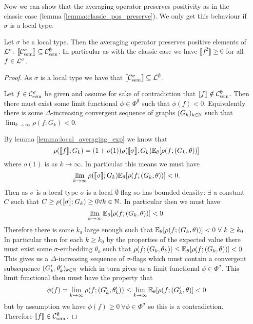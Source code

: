 Now we can show that the averaging operator preserves positivity as in the
classic case (lemma \ref{lemma:classic_pos_preserve}). We only get this
behaviour if $\sigma$ is a local type.

\begin{lemma}
    \label{lemma:local_pos_preserve}
    Let $\sigma$ be a local type. Then the averaging operator preserves positive
    elements of $\mathcal{L}^\sigma$:
    $\llbracket \mathcal{C}_\mathrm{sem}^\sigma \rrbracket \subseteq  \mathcal{C}_\mathrm{sem}^\emptyset$.
    In particular as with the classic case we have $\llbracket f^2 \rrbracket \geq 0$
    for all $f\in\mathcal{L}^\sigma$.
\end{lemma}

\begin{proof}
    As $\sigma$ is a local type we have that
    $\llbracket \mathcal{C}_\mathrm{sem}^\sigma \rrbracket \subseteq \mathcal{L}^\emptyset$.

    Let $f\in\mathcal{C}_\mathrm{sem}^\sigma$ be given and assume for sake of contradiction that
    $\llbracket f \rrbracket \notin\mathcal{C}_\mathrm{sem}^\emptyset$. Then there must exist
    some limit functional $\phi\in\Phi^\emptyset$ such that $\phi(f)<0$. Equivalently
    there is some $\Delta$-increasing convergent sequence of graphs $(G_k)_{k\in\mathbb{N}}$
    such that $\lim_{k\to\infty}\rho(f; G_k) < 0$.

    By lemma \ref{lemma:local_averaging_exp} we know that
    \[
        \rho(\llbracket f\rrbracket; G_k) = (1+o(1)) \rho(\llbracket \sigma \rrbracket; G_k)
        \mathbb{E}_\theta[\rho(f; (G_k,\theta))]
    \]
    where $o(1)$ is as $k \to \infty$.
    In particular this means we must have
    \[
        \lim_{k\to\infty} \rho(\llbracket \sigma \rrbracket; G_k)
        \mathbb{E}_\theta[\rho(f; (G_k,\theta))] < 0.
    \]
    Then as $\sigma$ is a local type $\sigma$ is a local $\emptyset$-flag so has bounded
    density: $\exists$ a constant $C$ such that $C \geq \rho(\llbracket\sigma\rrbracket; G_k) \geq
    0\forall k\in\mathbb{N}$. In particular then we must have
    \[
        \lim_{k\to\infty} \mathbb{E}_\theta[\rho(f; (G_k,\theta))] < 0.
    \]
    Therefore there is some $k_0$ large enough such that
    $\mathbb{E}_\theta[\rho(f; (G_k, \theta))] < 0\ \forall\ k \geq k_0$. In particular then
    for each $k \geq k_0$ by the properties of the expected value there must exist
    some $\sigma$-embedding $\theta_k$ such that
    $\rho(f; (G_k, \theta_k)) \leq \mathbb{E}_\theta[\rho(f; (G_k,\theta))] < 0$. This gives
    us a $\Delta$-increasing sequence of $\sigma$-flags which must contain a convergent
    subsequence $(G'_k, \theta'_k)_{k\in\mathbb{N}}$
    which in turn gives us a limit functional $\phi\in\Phi^\sigma$. This limit functional
    then must have the property that
    \[
        \phi(f) = \lim_{k\to\infty}\rho(f; (G'_k, \theta'_k))
        \leq \lim_{k\to\infty} \mathbb{E}_\theta[\rho(f; (G'_k, \theta)] < 0
    \]
    but by assumption we have $\phi(f) \geq 0\ \forall \phi\in\Phi^\sigma$ so this is
    a contradiction. Therefore $\llbracket f \rrbracket \in\mathcal{C}_\mathrm{sem}^\emptyset$.
\end{proof}

